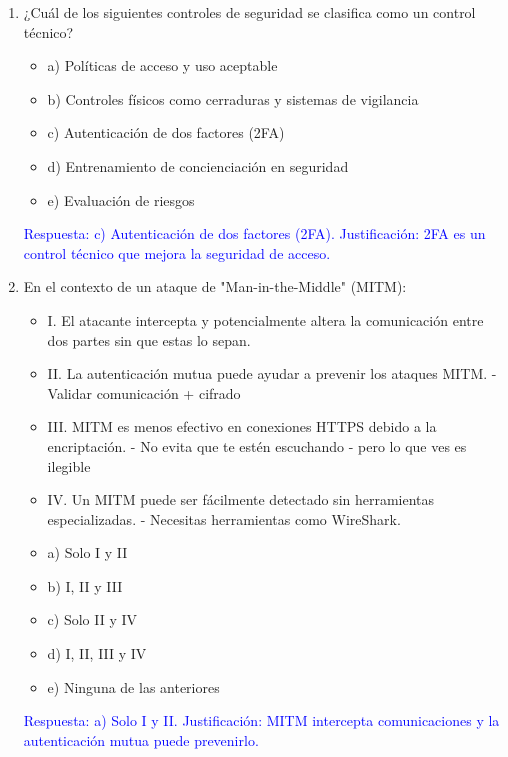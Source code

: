 \documentclass[a4paper]{article}
\begin{document}
\begin{enumerate}
    \item ¿Cuál de los siguientes controles de seguridad se clasifica como un control técnico?
    \begin{itemize}
        \item a) Políticas de acceso y uso aceptable
        \item b) Controles físicos como cerraduras y sistemas de vigilancia
        \item c) Autenticación de dos factores (2FA)
        \item d) Entrenamiento de concienciación en seguridad
        \item e) Evaluación de riesgos
    \end{itemize}
    \textcolor{blue}{Respuesta: c) Autenticación de dos factores (2FA). Justificación: 2FA es un control técnico que mejora la seguridad de acceso.}
    \vspace{1cm}
    
    \item En el contexto de un ataque de "Man-in-the-Middle" (MITM):
    \begin{itemize}
        \item I. El atacante intercepta y potencialmente altera la comunicación entre dos partes sin que estas lo sepan.
        \item II. La autenticación mutua puede ayudar a prevenir los ataques MITM. - Validar comunicación + cifrado
        \item III. MITM es menos efectivo en conexiones HTTPS debido a la encriptación. - No evita que te estén escuchando - pero lo que ves es ilegible
        \item IV. Un MITM puede ser fácilmente detectado sin herramientas especializadas. - Necesitas herramientas como WireShark.
    \end{itemize}
    \begin{itemize}
        \item a) Solo I y II
        \item b) I, II y III
        \item c) Solo II y IV
        \item d) I, II, III y IV
        \item e) Ninguna de las anteriores
    \end{itemize}
    \textcolor{blue}{Respuesta: a) Solo I y II. Justificación: MITM intercepta comunicaciones y la autenticación mutua puede prevenirlo.}
    \vspace{1cm}
    

\end{enumerate}
\end{document}
